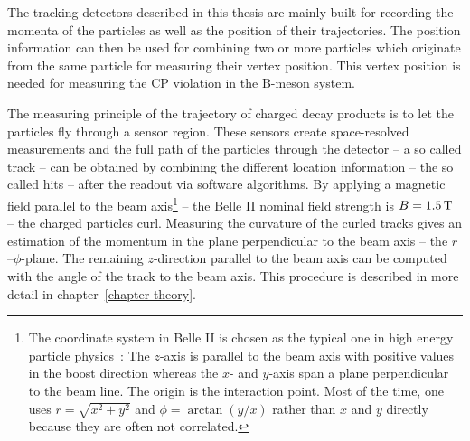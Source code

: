 The tracking detectors described in this thesis are mainly built for recording the momenta of the particles as well as the position of their trajectories. The position information can then be used for combining two or more particles which originate from the same particle for measuring their vertex position. This vertex position is needed for measuring the CP violation in the B-meson system. %

The measuring principle of the trajectory of charged decay products is to let the particles fly through a sensor region. These sensors create space-resolved measurements and the full path of the particles through the detector -- a so called track -- can be obtained by combining the different location information -- the so called hits -- after the readout via software algorithms. By applying a magnetic field parallel to the beam axis\footnote{The coordinate system in Belle II is chosen as the typical one in high energy particle physics~\cite{coordinate}: The $z$-axis is parallel to the beam axis with positive values in the boost direction whereas the $x$- and $y$-axis span a plane perpendicular to the beam line. The origin is the interaction point. Most of the time, one uses $r = \sqrt{x^2 + y^2}$ and $\phi = \arctan(y/x)$ rather than $x$ and $y$ directly because they are often not correlated.} -- the Belle II nominal field strength is $B = \unit[1.5]{T}$ -- the charged particles curl. Measuring the curvature of the curled tracks gives an estimation of the momentum in the plane perpendicular to the beam axis -- the $r$--$\phi$-plane. The remaining $z$-direction parallel to the beam axis can be computed with the angle of the track to the beam axis. This procedure is described in more detail in chapter~\ref{chapter-theory}.

